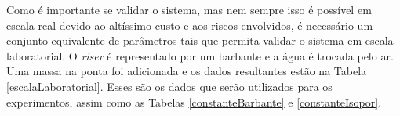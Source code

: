 Como é importante se validar o sistema, mas nem sempre isso é possível em escala real devido ao altíssimo custo e aos riscos envolvidos, é necessário um conjunto equivalente de parâmetros tais que permita validar o sistema em escala laboratorial. O \textit{riser} é representado por um barbante e a água é trocada pelo ar. Uma massa na ponta foi adicionada e os dados resultantes estão na Tabela \ref{escalaLaboratorial}. Esses são os dados que serão utilizados para os experimentos, assim como as Tabelas \ref{constanteBarbante} e \ref{constanteIsopor}.
